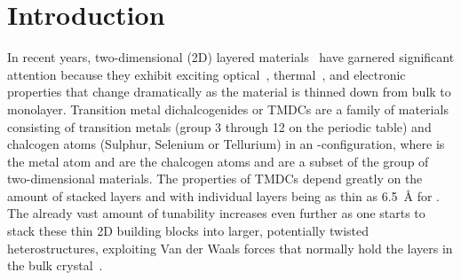 \chapter{Introduction}
%
In recent years, two-dimensional (2D) layered materials~\cite{2dmat, LI2016322, https://doi.org/10.1002/smll.202107059} have garnered significant attention because they exhibit exciting optical~\cite{optic1, yuHighlyEfficientGatetunable2013, dengBlackPhosphorusMonolayer2014, chengElectroluminescencePhotocurrentGeneration2014}, thermal~\cite{popThermalPropertiesGraphene2012, chenThermoelectricTransportGraphene2015}, and electronic~\cite{britnellFieldEffectTunnelingTransistor2012, georgiouVerticalFieldeffectTransistor2013, yuVerticallyStackedMultiheterostructures2013,moriyaLargeCurrentModulation2014, sarkarSubthermionicTunnelFieldeffect2015} properties that change dramatically as the material is thinned down from bulk to monolayer.
%
Transition metal dichalcogenides or TMDCs are a family of materials consisting of transition metals (group 3 through 12 on the periodic table) and chalcogen atoms (Sulphur, Selenium or Tellurium) in an -configuration, where  is the metal atom and  are the chalcogen atoms and are a subset of the group of two-dimensional materials\cite{C7TA04268J}. The properties of TMDCs depend greatly on the amount of stacked layers and with individual layers being as thin as \SI{6.5}{\angstrom} for .
%
The already vast amount of tunability increases even further as one starts to stack these thin 2D building blocks into larger, potentially twisted heterostructures, exploiting Van der Waals forces that normally hold the layers in the bulk crystal~\cite{ScopusDocumentDetails, buscemaPhotocurrentGenerationTwodimensional2015, geimVanWaalsHeterostructures2013}.\\

